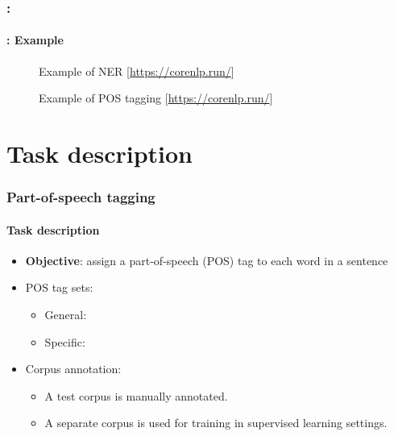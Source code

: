 \documentclass[xcolor=table]{beamer}
\begin{document}
\begin{frame}
	\frametitle{\insertshortsubtitle: \insertsection}
	\framesubtitle{\insertsubsection: Example}

	\begin{figure}
		\centering
		\caption{Example of NER [\url{https://corenlp.run/}]}
	\end{figure}
	
	\begin{figure}
		\centering
		\caption{Example of POS tagging [\url{https://corenlp.run/}]}
	\end{figure}

\end{frame}


\section{Task description}

\begin{frame}
\frametitle{Part-of-speech tagging}
\framesubtitle{Task description}

	\begin{itemize}
		\item \textbf{Objective}: assign a part-of-speech (POS) tag to each word in a sentence
		
		\item POS tag sets:
		\begin{itemize}
			\item General: 
			\item Specific: 
		\end{itemize}
		
		\item Corpus annotation:
		\begin{itemize}
			\item A test corpus is manually annotated.
			\item A separate corpus is used for training in supervised learning settings.
		\end{itemize}
	\end{itemize}

\end{frame}
\end{document}
